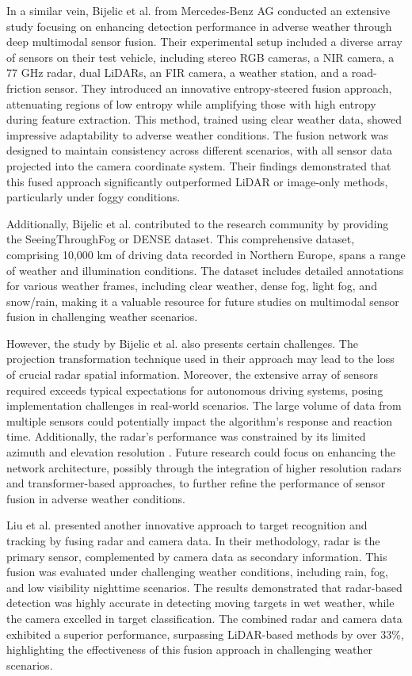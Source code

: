 \documentclass[report.tex]{subfiles}
\begin{document}
    In a similar vein, Bijelic et al. \cite{bijelic2020seeing} from Mercedes-Benz AG conducted an extensive study focusing on enhancing detection performance in adverse weather through deep multimodal sensor fusion. Their experimental setup included a diverse array of sensors on their test vehicle, including stereo RGB cameras, a NIR camera, a 77 GHz radar, dual LiDARs, an FIR camera, a weather station, and a road-friction sensor. They introduced an innovative entropy-steered fusion approach, attenuating regions of low entropy while amplifying those with high entropy during feature extraction. This method, trained using clear weather data, showed impressive adaptability to adverse weather conditions. The fusion network was designed to maintain consistency across different scenarios, with all sensor data projected into the camera coordinate system. Their findings demonstrated that this fused approach significantly outperformed LiDAR or image-only methods, particularly under foggy conditions.

    Additionally, Bijelic et al. \cite{bijelic2020seeing} contributed to the research community by providing the SeeingThroughFog or DENSE dataset. This comprehensive dataset, comprising 10,000 km of driving data recorded in Northern Europe, spans a range of weather and illumination conditions. The dataset includes detailed annotations for various weather frames, including clear weather, dense fog, light fog, and snow/rain, making it a valuable resource for future studies on multimodal sensor fusion in challenging weather scenarios.

    However, the study by Bijelic et al. \cite{bijelic2020seeing} also presents certain challenges. The projection transformation technique used in their approach may lead to the loss of crucial radar spatial information. Moreover, the extensive array of sensors required exceeds typical expectations for autonomous driving systems, posing implementation challenges in real-world scenarios. The large volume of data from multiple sensors could potentially impact the algorithm's response and reaction time. Additionally, the radar's performance was constrained by its limited azimuth and elevation resolution \cite{Zhang2021Dec}. Future research could focus on enhancing the network architecture, possibly through the integration of higher resolution radars and transformer-based approaches, to further refine the performance of sensor fusion in adverse weather conditions.

    Liu et al. \cite{liu2021robust} presented another innovative approach to target recognition and tracking by fusing radar and camera data. In their methodology, radar is the primary sensor, complemented by camera data as secondary information. This fusion was evaluated under challenging weather conditions, including rain, fog, and low visibility nighttime scenarios. The results demonstrated that radar-based detection was highly accurate in detecting moving targets in wet weather, while the camera excelled in target classification. The combined radar and camera data exhibited a superior performance, surpassing LiDAR-based methods by over 33\%, highlighting the effectiveness of this fusion approach in challenging weather scenarios.
\end{document}
